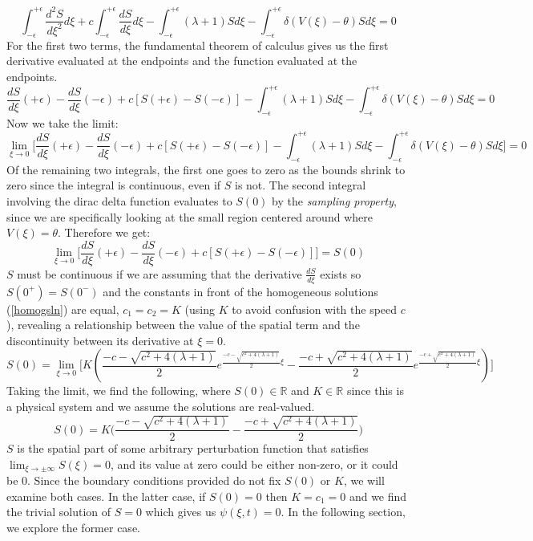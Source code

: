 \documentclass[12pt]{article}
\begin{document}
$$ \int_{-\epsilon}^{+\epsilon}\frac{d^2S}{d\xi^2}d\xi + c\int_{-\epsilon}^{+\epsilon}\frac{dS}{d\xi}d\xi - \int_{-\epsilon}^{+\epsilon}(\lambda + 1)Sd\xi - \int_{-\epsilon}^{+\epsilon}\delta(V(\xi)-\theta)Sd\xi = 0 $$
For the first two terms, the fundamental theorem of calculus gives us the first derivative evaluated at the endpoints and the function evaluated at the endpoints.
$$ \frac{dS}{d\xi}(+\epsilon) - \frac{dS}{d\xi}(-\epsilon) + c[S(+\epsilon) - S(-\epsilon)] - \int_{-\epsilon}^{+\epsilon}(\lambda + 1)Sd\xi - \int_{-\epsilon}^{+\epsilon}\delta(V(\xi)-\theta)Sd\xi = 0 $$
Now we take the limit:
$$ \lim_{\xi \to 0} \Bigg[ \frac{dS}{d\xi}(+\epsilon) - \frac{dS}{d\xi}(-\epsilon) + c[S(+\epsilon) - S(-\epsilon)] - \int_{-\epsilon}^{+\epsilon}(\lambda + 1)Sd\xi - \int_{-\epsilon}^{+\epsilon}\delta(V(\xi)-\theta)Sd\xi \Bigg]= 0 $$
Of the remaining two integrals, the first one goes to zero as the bounds shrink to zero since the integral is continuous, even if $S$ is not. The second integral involving the dirac delta function evaluates to $S(0)$ by the \textit{sampling property}, since we are specifically looking at the small region centered around where $V(\xi) = \theta$. Therefore we get:
$$ \lim_{\xi \to 0} \Bigg[ \frac{dS}{d\xi}(+\epsilon) - \frac{dS}{d\xi}(-\epsilon) + c[S(+\epsilon) - S(-\epsilon)] \Bigg] = S(0) $$
$S$ must be continuous if we are assuming that the derivative $\frac{dS}{d\xi}$ exists so $S(0^+) = S(0^-)$ and the constants in front of the homogeneous solutions (\ref{homogsln}) are equal, $c_1 = c_2 = K$ (using $K$ to avoid confusion with the speed $c$), revealing a relationship between the value of the spatial term and the discontinuity between its derivative at $\xi=0$.
$$ S(0) = \lim_{\xi \to 0} \Bigg[ K(\frac{-c-\sqrt{c^2+4(\lambda+1)}}{2}e^{\frac{-c-\sqrt{c^2+4(\lambda+1)}}{2}\xi} - \frac{-c+\sqrt{c^2+4(\lambda+1)}}{2}e^{\frac{-c+\sqrt{c^2+4(\lambda+1)}}{2}\xi})\Bigg] $$
Taking the limit, we find the following, where $S(0)\in \mathbb{R}$ and $K\in\mathbb{R}$ since this is a physical system and we assume the solutions are real-valued.
\begin{equation}\label{Keq}
S(0) = K\Bigg(\frac{-c-\sqrt{c^2+4(\lambda+1)}}{2} - \frac{-c+\sqrt{c^2+4(\lambda+1)}}{2} \Bigg)
\end{equation}
$S$ is the spatial part of some arbitrary perturbation function that satisfies $\lim_{\xi \to \pm \infty}S(\xi) = 0$, and its value at zero could be either non-zero, or it could be 0. Since the boundary conditions provided do not fix $S(0)$ or $K$, we will examine both cases. In the latter case, if $S(0) = 0$ then $K=c_1=0$ and we find the trivial solution of $S=0$ which gives us $\psi(\xi,t) = 0$. In the following section, we explore the former case.
\end{document}
